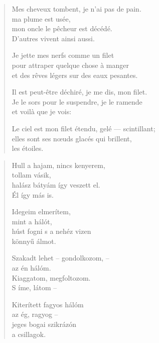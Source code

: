 \documentclass[11pt]{book}
\newcommand*{\centeredornament}{\centerline{\pgfornament[width=6cm]{88}}}
\begin{document}
\newpage

\vspace*{-15mm}
\centeredornament



\begin{verse}
  Mes cheveux tombent, je n'ai pas de pain. \\
  ma plume est usée, \\
  mon oncle le pêcheur est décédé. \\
  D'autres vivent ainsi aussi.

  Je jette mes nerfs comme un filet \\
  pour attraper quelque chose à manger \\
  et des rêves légers sur des eaux pesantes.

  Il est peut-être déchiré, je me dis, mon filet. \\
  Je le sors pour le suspendre, je le ramende \\
  et voilà que je vois:

  Le ciel est mon filet étendu, gelé --- scintillant;\hspace*{-1mm} \\
  elles sont ses nœuds glacés qui brillent, \\
  les étoiles.
\end{verse}

\newpage

\vspace*{-15mm}
\centeredornament



\begin{verse}
  Hull a hajam, nincs kenyerem, \\
  tollam vásik, \\
  halász bátyám így veszett el. \\
  Él így más is.

  Idegeim elmerítem, \\
  mint a hálót, \\
  húst fogni s a nehéz vizen \\
  könnyű álmot.

  Szakadt lehet -- gondolkozom, -- \\
  az én hálóm. \\
  Kiaggatom, megfoltozom. \\
  S íme, látom --

  Kiterített fagyos hálóm \\
  az ég, ragyog -- \\
  jeges bogai szikrázón \\
  a csillagok.
\end{verse}
\end{document}
